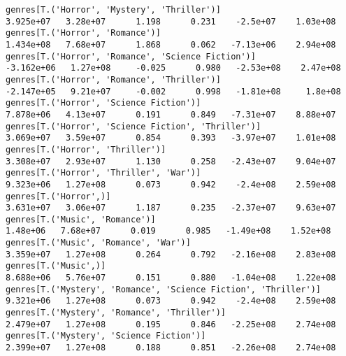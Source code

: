 \documentclass[11pt]{article}
\begin{document}
\begin{Verbatim}[commandchars=\\\{\}]
genres[T.('Horror', 'Mystery', 'Thriller')]                                                                   3.925e+07   3.28e+07      1.198      0.231    -2.5e+07    1.03e+08
genres[T.('Horror', 'Romance')]                                                                               1.434e+08   7.68e+07      1.868      0.062   -7.13e+06    2.94e+08
genres[T.('Horror', 'Romance', 'Science Fiction')]                                                           -3.162e+06   1.27e+08     -0.025      0.980   -2.53e+08    2.47e+08
genres[T.('Horror', 'Romance', 'Thriller')]                                                                  -2.147e+05   9.21e+07     -0.002      0.998   -1.81e+08     1.8e+08
genres[T.('Horror', 'Science Fiction')]                                                                       7.878e+06   4.13e+07      0.191      0.849   -7.31e+07    8.88e+07
genres[T.('Horror', 'Science Fiction', 'Thriller')]                                                           3.069e+07   3.59e+07      0.854      0.393   -3.97e+07    1.01e+08
genres[T.('Horror', 'Thriller')]                                                                              3.308e+07   2.93e+07      1.130      0.258   -2.43e+07    9.04e+07
genres[T.('Horror', 'Thriller', 'War')]                                                                       9.323e+06   1.27e+08      0.073      0.942    -2.4e+08    2.59e+08
genres[T.('Horror',)]                                                                                         3.631e+07   3.06e+07      1.187      0.235   -2.37e+07    9.63e+07
genres[T.('Music', 'Romance')]                                                                                 1.48e+06   7.68e+07      0.019      0.985   -1.49e+08    1.52e+08
genres[T.('Music', 'Romance', 'War')]                                                                         3.359e+07   1.27e+08      0.264      0.792   -2.16e+08    2.83e+08
genres[T.('Music',)]                                                                                          8.688e+06   5.76e+07      0.151      0.880   -1.04e+08    1.22e+08
genres[T.('Mystery', 'Romance', 'Science Fiction', 'Thriller')]                                               9.321e+06   1.27e+08      0.073      0.942    -2.4e+08    2.59e+08
genres[T.('Mystery', 'Romance', 'Thriller')]                                                                  2.479e+07   1.27e+08      0.195      0.846   -2.25e+08    2.74e+08
genres[T.('Mystery', 'Science Fiction')]                                                                      2.399e+07   1.27e+08      0.188      0.851   -2.26e+08    2.74e+08

\end{Verbatim}
\end{document}
